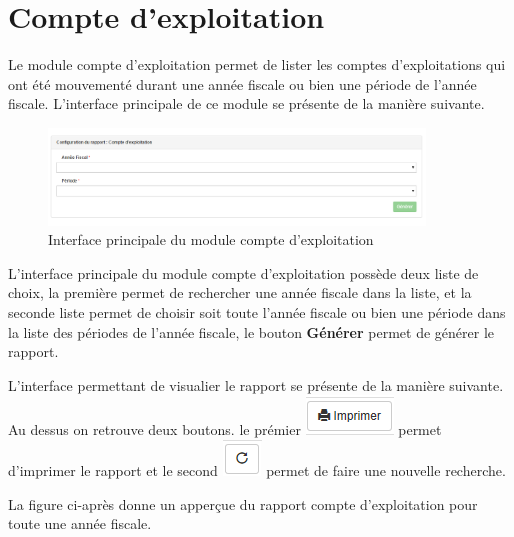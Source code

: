 \documentclass[12pt,a4paper]{report}
\begin{document}
\newpage
\section{Compte d'exploitation}
Le module compte d'exploitation permet de lister les comptes d'exploitations qui ont été mouvementé durant une année fiscale ou bien une période de l'année fiscale. L'interface principale de ce module se présente de la manière suivante.

\begin{figure}[h]
\begin{center}
\includegraphics[width=10cm]{pic/ComptExploitation.png}
\end{center}
\caption{Interface principale du module compte d'exploitation}
\label{Interface principale du module compte d'exploitation}
\end{figure}

L'interface principale du module compte d'exploitation possède deux liste de choix, la première permet de rechercher une année fiscale dans la liste, et la seconde liste permet de choisir soit toute l'année fiscale ou bien une période dans la liste des périodes de l'année fiscale, le bouton \textbf{Générer} permet de générer le rapport.

L'interface permettant de visualier le rapport se présente de la manière suivante. Au dessus on retrouve deux boutons. le prémier 
\includegraphics[scale=0.7]{pic/Print.png} permet d'imprimer le rapport et le second \includegraphics[scale=0.7]{pic/refresh.png} permet de faire une nouvelle recherche.

La figure ci-après donne un apperçue du rapport compte d'exploitation pour toute une année fiscale.
\end{document}
